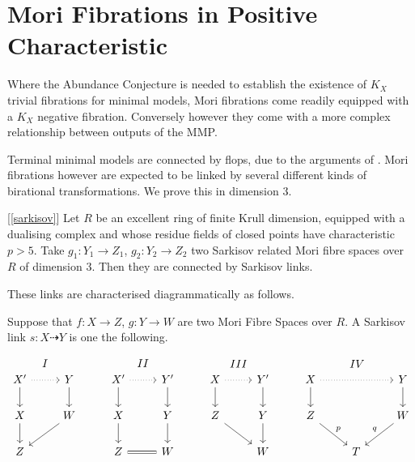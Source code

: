 \documentclass[a4paper,12pt]{book}
\let \OldSection \section
\renewcommand{\section}[1]{\OldSection{#1} \thispagestyle{section}}
\begin{document}
	
	\section{Mori Fibrations in Positive Characteristic}
	
	Where the Abundance Conjecture is needed to establish the existence of $K_{X}$ trivial fibrations for minimal models, Mori fibrations come readily equipped with a $K_{X}$ negative fibration. Conversely however they come with a more complex relationship between outputs of the MMP. 
	
	Terminal minimal models are connected by flops, due to the arguments of \cite{kawamata2008flops}. Mori fibrations however are expected to be linked by several different kinds of birational transformations. We prove this in dimension $3$.
	
	\begin{theo}\label{Main_Finite1}[\autoref{sarkisov}]
		Let $R$ be an excellent ring of finite Krull dimension, equipped with a dualising complex and whose residue fields of closed points have characteristic $p>5$. Take $g_{1}:Y_{1} \to Z_{1}$, $g_{2}:Y_{2} \to Z_{2}$ two Sarkisov related Mori fibre spaces over $R$ of dimension $3$. Then they are connected by Sarkisov links.
	\end{theo}
	
	These links are characterised diagrammatically as follows.
	
	Suppose that $f:X \to Z$, $g:Y \to W$ are two Mori Fibre Spaces over $R$. A Sarkisov link $s:X \dashrightarrow Y$ is one the following.
	
	\[\begin{tikzcd}
	X' \arrow[d] \arrow[r, dotted] \arrow[r, "I", phantom, bend left=49] & Y \arrow[d]  & X' \arrow[r, dotted] \arrow[d] \arrow[r, "II",phantom, bend left=49] & Y' \arrow[d] & X \arrow[r, dotted] \arrow[d] \arrow[r, "III", phantom, bend left=49] & Y' \arrow[d] & X \arrow[d] \arrow[rr, dotted] \arrow[rr, "IV",phantom, bend left] &   & Y \arrow[d]       \\
	X \arrow[d]                                                          & W \arrow[ld] & X \arrow[d]                                               & Y \arrow[d]  & Z \arrow[rd]                                              & Y \arrow[d]  & Z \arrow[rd, "p"]                                          &   & W \arrow[ld, "q"'] \\
	Z                                                                    &              & Z \arrow[r, equal]                                                         & W            &                                                           & W            &                                                            & T &                  
	\end{tikzcd} \]
	
\end{document}
